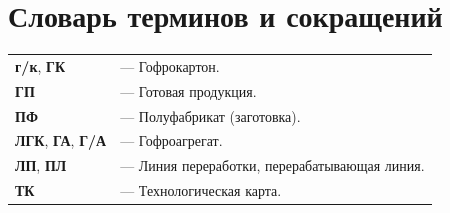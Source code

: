
\def \notincludehead{}






 	\maketitle

% 	

	\scriptsize
	\setcounter{tocdepth}{4}
	\tableofcontents
	\normalsize
	\newpage

 	
 	
 	 	
 	
 	\newpage
 	
 	
 \section*{Словарь терминов и сокращений}
\noindent

\begin{tabular}{l l}
{\bf г/к}, {\bf ГК}  & --- Гофрокартон.\\
{\bf ГП}  & --- Готовая продукция.\\
{\bf ПФ}  & --- Полуфабрикат (заготовка).\\
{\bf ЛГК}, {\bf ГА}, {\bf Г/А}  & --- Гофроагрегат.\\
{\bf ЛП}, {\bf ПЛ}  & --- Линия переработки, перерабатывающая линия.\\
{\bf ТК}  & --- Технологическая карта.\\
	
\end{tabular}






\newcommand*{\IsScancode}{0}  %
\newcommand*{\IsOKP}{0}       %
\newcommand*{\IsOPC}{0}       %



\newpage



